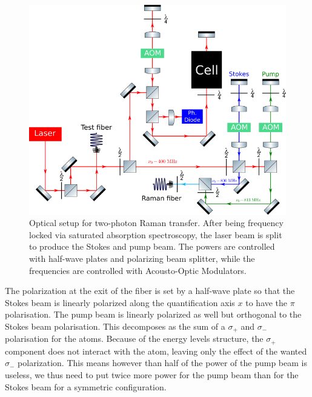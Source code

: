 \begin{figure}
    \centering
    \includegraphics[width=\textwidth]{Fig/Chapter3/table_raman.png}
    \caption{Optical setup for two-photon Raman transfer. After being frequency locked via saturated absorption spectroscopy, the laser beam is split to produce the Stokes and pump beam. The powers are controlled with half-wave plates and polarizing beam splitter, while the frequencies are controlled with Acousto-Optic Modulators.}
    \label{fig:raman_table}
\end{figure}

The polarization at the exit of the fiber is set by a half-wave plate so that the Stokes beam is linearly polarized along the quantification axis $x$ to have the $\pi$ polarisation. The pump beam is linearly polarized as well but orthogonal to the Stokes beam polarisation. This decomposes as the sum of a $\sigma_+$ and $\sigma_-$ polarisation for the atoms. Because of the energy levels structure, the $\sigma_+$ component does not interact with the atom, leaving only the effect of the wanted $\sigma_-$ polarization. This means however than half of the power of the pump beam is useless, we thus need to put twice more power for the pump beam than for the Stokes beam for a symmetric configuration.


